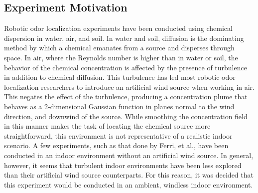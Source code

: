 \documentclass[submit, 12pt]{aiaa-pretty-modified}
\begin{document}
\subsection{Experiment Motivation}
Robotic odor localization experiments have been conducted using chemical
dispersion in water, air, and soil.\cite{kowadlo} In water and soil, diffusion is the
dominating method by which a chemical emanates from a source and disperses
through space. In air, where the Reynolds number is higher than in water or
soil, the behavior of the chemical concentration is affected by the presence of
turbulence in addition to chemical diffusion.\cite{kowadlo} This turbulence
 has led most robotic odor localization researchers to introduce an
artificial wind source when working in air. This negates the effect of the
turbulence, producing a concentration plume that behaves as a 2-dimensional
Gaussian function in planes normal to the wind direction, and downwind of the
source. \cite{ferri} While smoothing the concentration field in this manner makes the task of locating the
chemical source more straightforward, this environment is not representative of
a realistic indoor scenario. A few experiments, such as that done by Ferri, et
al., have been conducted in an indoor environment without an artificial wind
source. \cite{ferri} In general, however, it seems that turbulent indoor environments
have been less explored than their artificial wind source counterparts. For this
reason, it was decided that this experiment would be conducted in an ambient,
windless indoor environment.
\end{document}

